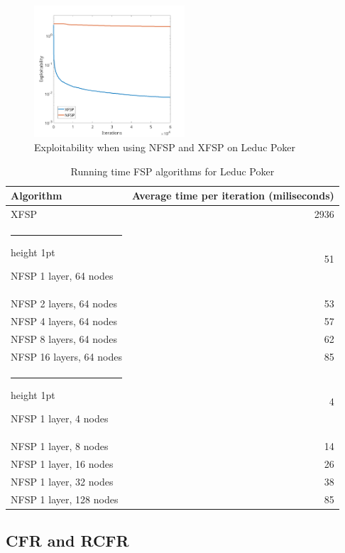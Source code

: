 \documentclass[10pt,a4paper]{article}
\makeatletter
\newcommand{\thickhline}{%
    \noalign {\ifnum 0=`}\fi \hrule height 1pt
    \futurelet \reserved@a \@xhline
}
\makeatother
\begin{document}
\begin{center}
	\begin{figure}[h]
	\centering
	\label{fig:layers_kuhn}
	\includegraphics[width=0.5\textwidth]{Figures/xfsp_nfsp_leduc.png}
	\caption{Exploitability when using NFSP and XFSP on Leduc Poker}
	\end{figure}
	\end{center}

\begin{table}
\begin{center}
\begin{tabular}{|l|r|}
\hline 
Algorithm & Average time per iteration (miliseconds) \\\hline 
XFSP & 2936 \\ 
\thickhline 
NFSP 1 layer, 64 nodes & 51 \\ 
\hline 
NFSP 2 layers, 64 nodes  & 53 \\ 
\hline 
NFSP 4 layers, 64 nodes & 57 \\ 
\hline 
NFSP 8 layers, 64 nodes & 62 \\ 
\hline 
NFSP 16 layers, 64 nodes & 85 \\ 
\thickhline
NFSP 1 layer, 4 nodes & 4 \\ 
\hline 
NFSP 1 layer, 8 nodes & 14 \\ 
\hline 
NFSP 1 layer, 16 nodes & 26 \\ 
\hline 
NFSP 1 layer, 32 nodes & 38 \\ 
\hline 
NFSP 1 layer, 128 nodes & 85 \\ 
\hline 
\end{tabular}
\caption{Running time FSP algorithms for Leduc Poker}
\label{tab:fsp_leduc}
\end{center}
\end{table} 

\subsection{CFR and RCFR}
\end{document}
